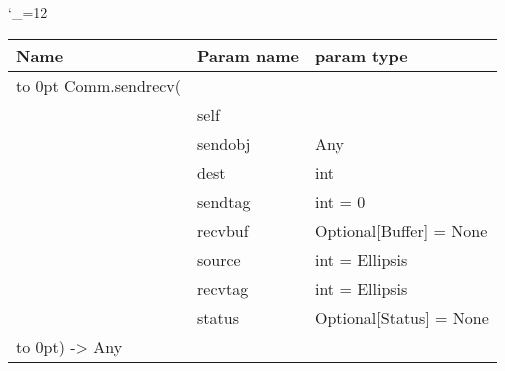\begingroup \catcode`\_=12 \tt
\begin{tabular}{lll}
\toprule
\textrm{Name}&\textrm{Param name}&\textrm{param type}\\
\midrule
\hbox to 0pt {Comm.sendrecv(\hss}\\
& self\\
& sendobj & Any\\
& dest & int\\
& sendtag & int = 0\\
& recvbuf & Optional[Buffer] = None\\
& source & int = Ellipsis\\
& recvtag & int = Ellipsis\\
& status & Optional[Status] = None\\
\hbox to 0pt{) -> Any\hss}\\
\bottomrule
\end{tabular}
\endgroup
